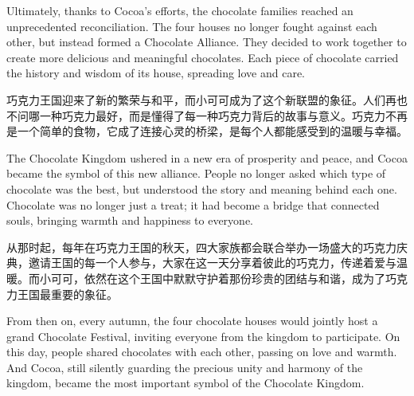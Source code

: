 \begin{flushright} Ultimately, thanks to Cocoa’s efforts, the chocolate families reached an unprecedented reconciliation. The four houses no longer fought against each other, but instead formed a Chocolate Alliance. They decided to work together to create more delicious and meaningful chocolates. Each piece of chocolate carried the history and wisdom of its house, spreading love and care. \end{flushright}

巧克力王国迎来了新的繁荣与和平，而小可可成为了这个新联盟的象征。人们再也不问哪一种巧克力最好，而是懂得了每一种巧克力背后的故事与意义。巧克力不再是一个简单的食物，它成了连接心灵的桥梁，是每个人都能感受到的温暖与幸福。

\begin{flushright} The Chocolate Kingdom ushered in a new era of prosperity and peace, and Cocoa became the symbol of this new alliance. People no longer asked which type of chocolate was the best, but understood the story and meaning behind each one. Chocolate was no longer just a treat; it had become a bridge that connected souls, bringing warmth and happiness to everyone. \end{flushright}

从那时起，每年在巧克力王国的秋天，四大家族都会联合举办一场盛大的巧克力庆典，邀请王国的每一个人参与，大家在这一天分享着彼此的巧克力，传递着爱与温暖。而小可可，依然在这个王国中默默守护着那份珍贵的团结与和谐，成为了巧克力王国最重要的象征。

\begin{flushright} From then on, every autumn, the four chocolate houses would jointly host a grand Chocolate Festival, inviting everyone from the kingdom to participate. On this day, people shared chocolates with each other, passing on love and warmth. And Cocoa, still silently guarding the precious unity and harmony of the kingdom, became the most important symbol of the Chocolate Kingdom. \end{flushright}
